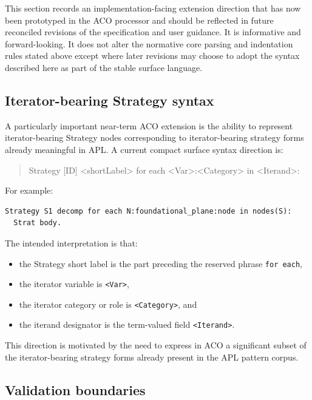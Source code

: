 \documentclass[11pt,twoside,a4paper]{article}
\begin{document}
This section records an implementation-facing extension direction that has now been prototyped in the ACO processor and should be reflected in future reconciled revisions of the specification and user guidance.
It is informative and forward-looking.
It does not alter the normative core parsing and indentation rules stated above except where later revisions may choose to adopt the syntax described here as part of the stable surface language.

\subsection{Iterator-bearing Strategy syntax}

A particularly important near-term ACO extension is the ability to represent iterator-bearing Strategy nodes corresponding to iterator-bearing strategy forms already meaningful in APL.
A current compact surface syntax direction is:
\begin{quote}\ttfamily
Strategy [ID] <shortLabel> for each <Var>:<Category> in <Iterand>:
\end{quote}

For example:
\begin{verbatim}
Strategy S1 decomp for each N:foundational_plane:node in nodes(S):
  Strat body.
\end{verbatim}

The intended interpretation is that:
\begin{itemize}[leftmargin=2em]
  \item the Strategy short label is the part preceding the reserved phrase \texttt{for each},
  \item the iterator variable is \texttt{<Var>},
  \item the iterator category or role is \texttt{<Category>}, and
  \item the iterand designator is the term-valued field \texttt{<Iterand>}.
\end{itemize}

This direction is motivated by the need to express in ACO a significant subset of the iterator-bearing strategy forms already present in the APL pattern corpus.

\subsection{Validation boundaries}
\end{document}
